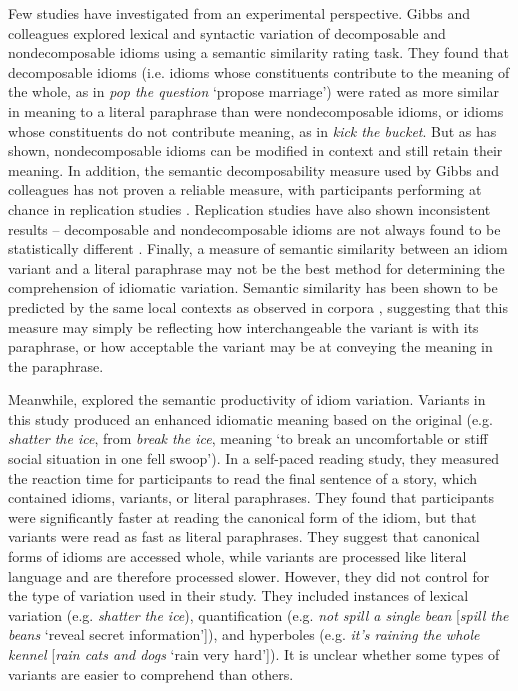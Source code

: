\documentclass[output=paper
,modfonts
,nonflat]{langsci/langscibook}
\begin{document}
Few studies have investigated  from an experimental perspective. Gibbs and colleagues \citep{GibbsEtAl1989, GibbsNayak1989} explored lexical and syntactic variation of decomposable and nondecomposable idioms using a semantic similarity rating task. They found that decomposable idioms (i.e. idioms whose constituents contribute to the meaning of the whole, as in \textit{pop the question} `propose marriage') were rated as more similar in meaning to a literal paraphrase than were nondecomposable idioms, or idioms whose constituents do not contribute meaning, as in \textit{kick the bucket}. But as \citet{Duffley2013} has shown, nondecomposable idioms can be modified in context and still retain their meaning. In addition, the semantic decomposability measure used by Gibbs and colleagues has not proven a reliable measure, with participants performing at chance in replication studies \citep{TitoneConnine1994, TabossiEtAl2008}. Replication studies have also shown inconsistent results -- decomposable and nondecomposable idioms are not always found to be statistically different \citep{TabossiEtAl2008}. Finally, a measure of semantic similarity between an idiom variant and a literal paraphrase may not be the best method for determining the comprehension of idiomatic variation. Semantic similarity has been shown to be predicted by the same local contexts as observed in corpora \citep{MillerCharles1991}, suggesting that this measure may simply be reflecting how interchangeable the variant is with its paraphrase, or how acceptable the variant may be at conveying the meaning in the paraphrase.

Meanwhile, \citet{McGloneEtAl1994} explored the semantic productivity of idiom variation. Variants in this study produced an enhanced idiomatic meaning based on the original (e.g. \textit{shatter the ice}, from \textit{break the ice}, meaning `to break an uncomfortable or stiff social situation in one fell swoop'). In a self-paced reading study, they measured the reaction time for participants to read the final sentence of a story, which contained idioms, variants, or literal paraphrases. They found that participants were significantly faster at reading the canonical form of the idiom, but that variants were read as fast as literal paraphrases. They suggest that canonical forms of idioms are accessed whole, while variants are processed like literal language and are therefore processed slower. However, they did not control for the type of variation used in their study. They included instances of lexical variation (e.g. \textit{shatter the ice}), quantification (e.g. \textit{not spill a single bean} [\textit{spill the beans} `reveal secret information']), and hyperboles (e.g. \textit{it's raining the whole kennel} [\textit{rain cats and dogs} `rain very hard']). It is unclear whether some types of variants are easier to comprehend than others. 
\end{document}
